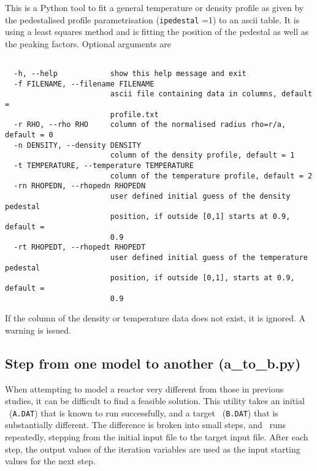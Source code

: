 This is a Python tool to fit a general temperature or density profile as given
by the pedestalised profile parametrisation (\texttt{ipedestal} =1) to an
ascii table. It is using a least squares method and is fitting the position of
the pedestal as well as the peaking factors.  Optional arguments are
\begin{verbatim}

  -h, --help            show this help message and exit
  -f FILENAME, --filename FILENAME
                        ascii file containing data in columns, default =
                        profile.txt
  -r RHO, --rho RHO     column of the normalised radius rho=r/a, default = 0
  -n DENSITY, --density DENSITY
                        column of the density profile, default = 1
  -t TEMPERATURE, --temperature TEMPERATURE
                        column of the temperature profile, default = 2
  -rn RHOPEDN, --rhopedn RHOPEDN
                        user defined initial guess of the density pedestal
                        position, if outside [0,1] starts at 0.9, default =
                        0.9
  -rt RHOPEDT, --rhopedt RHOPEDT
                        user defined initial guess of the temperature pedestal
                        position, if outside [0,1], starts at 0.9, default =
                        0.9

\end{verbatim}
If the column of the density or temperature data does not exist, it is
ignored. A warning is issued.



\subsection{Step from one model to another (a\_to\_b.py)}
\label{sec:atob}

When attempting to model a reactor very different from those in previous studies, it can be difficult to find a feasible solution.  This utility takes an initial \indat\ (\texttt{A.DAT}) that is known to run successfully, and a target \indat\ (\texttt{B.DAT}) that is substantially different.  The difference is broken into small steps, and \process\ runs repeatedly, stepping from the initial input file to the target input file.  After each step, the output values of the iteration variables are used as the input starting values for the next step.


